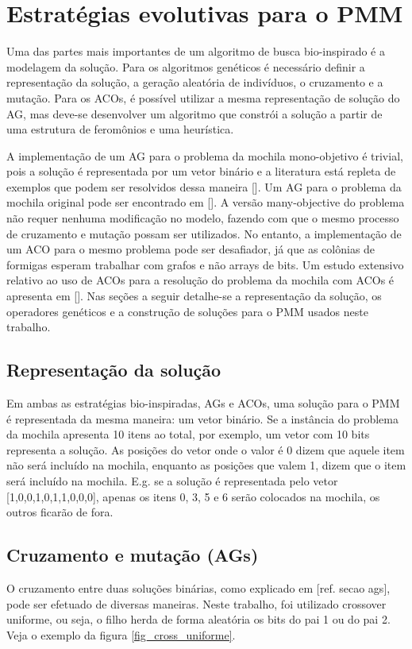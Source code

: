 \chapter[Estratégias evolutivas para o PMM]{Estratégias evolutivas para o PMM}

Uma das partes mais importantes de um algoritmo de busca bio-inspirado é a modelagem da solução. Para os algoritmos genéticos é necessário definir a representação da solução, a geração aleatória de indivíduos, o cruzamento e a mutação. Para os ACOs, é possível utilizar a mesma representação de solução do AG, mas deve-se desenvolver um algoritmo que constrói a solução a partir de uma estrutura de feromônios e uma heurística.

A implementação de um AG para o problema da mochila mono-objetivo é trivial, pois a solução é representada por um vetor binário e a literatura está repleta de exemplos que podem ser resolvidos dessa maneira []. Um AG para o problema da mochila original pode ser encontrado em []. A versão many-objective do problema não requer nenhuma modificação no modelo, fazendo com que o mesmo processo de cruzamento e mutação possam ser utilizados. No entanto, a implementação de um ACO para o mesmo problema pode ser desafiador, já que as colônias de formigas esperam trabalhar com grafos e não arrays de bits. Um estudo extensivo relativo ao uso de ACOs para a resolução do problema da mochila com ACOs é apresenta em []. Nas seções a seguir detalhe-se a representação da solução, os operadores genéticos e a construção de soluções para o PMM usados neste trabalho.

\section{Representação da solução}
Em ambas as estratégias bio-inspiradas, AGs e ACOs, uma solução para o PMM é representada da mesma maneira: um vetor binário. Se a instância do problema da mochila apresenta 10 itens ao total, por exemplo, um vetor com 10 bits representa a solução. As posições do vetor onde o valor é 0 dizem que aquele item não será incluído na mochila, enquanto as posições que valem 1, dizem que o item será incluído na mochila. E.g. se a solução é representada pelo vetor [1,0,0,1,0,1,1,0,0,0], apenas os itens 0, 3, 5 e 6 serão colocados na mochila, os outros ficarão de fora.

\section{Cruzamento e mutação (AGs)}
O cruzamento entre duas soluções binárias, como explicado em [ref. secao ags], pode ser efetuado de diversas maneiras. Neste trabalho, foi utilizado crossover uniforme, ou seja, o filho herda de forma aleatória os bits do pai 1 ou do pai 2. Veja o exemplo da figura \ref{fig_cross_uniforme}.

